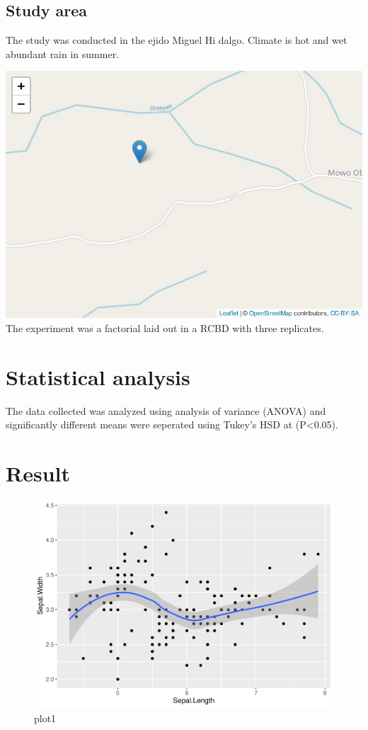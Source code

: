 \documentclass[preprint, 3p,
authoryear]{elsarticle} %
\begin{document}
\hypertarget{study-area}{%
\subsection{Study area}\label{study-area}}

The study was conducted in the ejido Miguel Hi dalgo. Climate is hot and
wet abundant rain in summer.

\includegraphics{Rticle-Template_files/figure-latex/Map-1.pdf} The
experiment was a factorial laid out in a RCBD with three replicates.

\hypertarget{statistical-analysis}{%
\section{Statistical analysis}\label{statistical-analysis}}

The data collected was analyzed using analysis of variance (ANOVA) and
significantly different means were seperated using Tukey's HSD at
(P\textless0.05).

\hypertarget{result}{%
\section{Result}\label{result}}

\begin{figure}
\centering
\includegraphics{Rticle-Template_files/figure-latex/unnamed-chunk-1-1.pdf}
\caption{plot1}
\end{figure}
\end{document}

